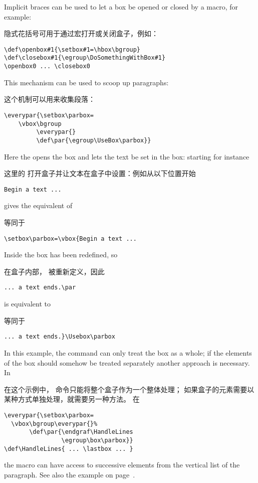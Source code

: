 Implicit braces can be used to let a box be opened or closed
by a macro, for example:

隐式花括号可用于通过宏打开或关闭盒子，例如：
\begin{verbatim}
\def\openbox#1{\setbox#1=\hbox\bgroup}
\def\closebox#1{\egroup\DoSomethingWithBox#1}
\openbox0 ... \closebox0
\end{verbatim}
This mechanism can be used to scoop up paragraphs:

这个机制可以用来收集段落：
\begin{verbatim}
\everypar{\setbox\parbox=
    \vbox\bgroup
         \everypar{}
         \def\par{\egroup\UseBox\parbox}}
\end{verbatim}
Here the  opens the box and lets the text be
set in the box: starting for instance

这里的  打开盒子并让文本在盒子中设置：例如从以下位置开始
\begin{verbatim}
Begin a text ...
\end{verbatim}
gives the equivalent of

等同于
\begin{verbatim}
\setbox\parbox=\vbox{Begin a text ...
\end{verbatim}
Inside the box  has been redefined, so

在盒子内部， 被重新定义，因此
\begin{verbatim}
... a text ends.\par
\end{verbatim}
is equivalent to

等同于
\begin{verbatim}
... a text ends.}\Usebox\parbox
\end{verbatim}

In this example, the  command can only treat the
box as a whole; if the elements of the box should somehow
be treated separately another approach is necessary.
In 

在这个示例中， 命令只能将整个盒子作为一个整体处理；
如果盒子的元素需要以某种方式单独处理，就需要另一种方法。
在
\begin{verbatim}
\everypar{\setbox\parbox=
  \vbox\bgroup\everypar{}%
       \def\par{\endgraf\HandleLines
                \egroup\box\parbox}}
\def\HandleLines{ ... \lastbox ... }
\end{verbatim}
the macro  can have access to successive
elements from the vertical list of the paragraph.
See also the example on page~\pageref{varioset}.

